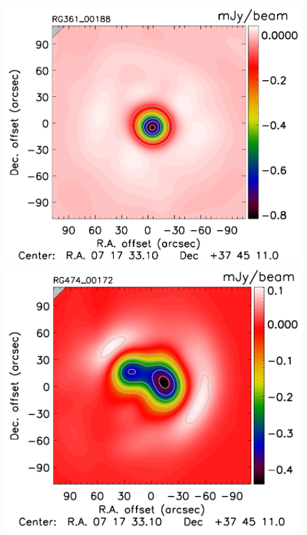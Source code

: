 \documentclass[twocolumn,traditabstract]{aa}
\begin{document}
\begin{figure}[h]
\includegraphics[trim=0cm 0.7cm 0cm 0cm, clip=true, totalheight=3.6cm]{Figure/DoG_RG361_00188_Ymap_zobs0p6_regrid_15_15_45.pdf}
\includegraphics[trim=0cm 0.7cm 0cm 0cm, clip=true, totalheight=3.6cm]{Figure/DoG_RG474_00172_Ymap_zobs0p9_regrid_15_15_45.pdf}

\end{figure}
\end{document}
